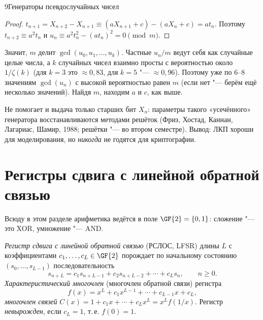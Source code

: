 \begin{lecture}{9}{Генераторы псевдослучайных чисел}
\begin{proof}
$t_{n+1} = X_{n+2} - X_{n+1} \equiv (a X_{n+1} + c) - (a X_n + c) = a t_n$. Поэтому
$t_{n+2} \equiv a^2 t_n$ и $u_n \equiv a^2 t_n^2 - (a t_n)^2 = 0 \pmod m$.
\end{proof}

Значит, $m$ делит $\gcd(u_0, u_1, \dots, u_k)$. Частные $u_n / m$ ведут себя как случайные
целые числа, а $k$ случайных чисел взаимно просты с вероятностью около $1/\zeta(k)$
(для $k = 3$ это $\approx 0{,}83$, для $k = 5$ "--- $\approx 0{,}96$). Поэтому уже по
$6$--$8$ значениям $\gcd(u_n)$ с высокой вероятностью равен $m$ (если нет "--- берём ещё
несколько значений). Найдя $m$, находим $a$ и $c$, как выше.


\begin{remark}
Не помогает и выдача только старших бит $X_n$: параметры такого «усечённого» генератора
восстанавливаются методами решёток (Фриз, Хостад, Каннан, Лагариас, Шамир, 1988; решётки "---
во втором семестре). Вывод: ЛКП хороши для моделирования, но \emph{никогда} не годятся для
криптографии.
\end{remark}


\section{Регистры сдвига с линейной обратной связью}

Всюду в этом разделе арифметика ведётся в поле $\GF{2} = \{0, 1\}$: сложение "--- это XOR,
умножение "--- AND.

\begin{definition}
\emph{Регистр сдвига с линейной обратной связью} (РСЛОС, LFSR) длины $L$ с коэффициентами
$c_1, \dots, c_L \in \GF{2}$ порождает по начальному состоянию $(s_0, \dots, s_{L-1})$
последовательность
\begin{equation}\label{l9:rec}
  s_{n+L} = c_1 s_{n+L-1} + c_2 s_{n+L-2} + \cdots + c_L s_n, \qquad n \ge 0.
\end{equation}
\emph{Характеристический многочлен} (многочлен обратной связи) регистра
\[
  f(x) = x^L + c_1 x^{L-1} + \cdots + c_{L-1} x + c_L,
\]
\emph{многочлен связей} $C(x) = 1 + c_1 x + \cdots + c_L x^L = x^L f(1/x)$. Регистр
\emph{невырожден}, если $c_L = 1$, т.\,е. $f(0) = 1$.
\end{definition}


\end{lecture}
